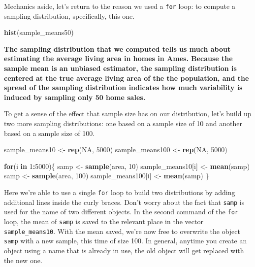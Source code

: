 \documentclass[]{book}
\newenvironment{Shaded}{\begin{snugshade}}{\end{snugshade}}
\newcommand{\KeywordTok}[1]{\textcolor[rgb]{0.13,0.29,0.53}{\textbf{#1}}}
\newcommand{\DecValTok}[1]{\textcolor[rgb]{0.00,0.00,0.81}{#1}}
\newcommand{\StringTok}[1]{\textcolor[rgb]{0.31,0.60,0.02}{#1}}
\newcommand{\OtherTok}[1]{\textcolor[rgb]{0.56,0.35,0.01}{#1}}
\newcommand{\ControlFlowTok}[1]{\textcolor[rgb]{0.13,0.29,0.53}{\textbf{#1}}}
\newcommand{\OperatorTok}[1]{\textcolor[rgb]{0.81,0.36,0.00}{\textbf{#1}}}
\newcommand{\NormalTok}[1]{#1}
\theoremstyle{definition}
\theoremstyle{definition}
\theoremstyle{definition}
\theoremstyle{remark}
\begin{document}
Mechanics aside, let's return to the reason we used a \texttt{for} loop:
to compute a sampling distribution, specifically, this one.

\begin{Shaded}
\begin{Highlighting}[]
\KeywordTok{hist}\NormalTok{(sample_means50)}
\end{Highlighting}
\end{Shaded}

\textbf{The sampling distribution that we computed tells us much about
estimating the average living area in homes in Ames. Because the sample
mean is an unbiased estimator, the sampling distribution is centered at
the true average living area of the the population, and the spread of
the sampling distribution indicates how much variability is induced by
sampling only 50 home sales.}

To get a sense of the effect that sample size has on our distribution,
let's build up two more sampling distributions: one based on a sample
size of 10 and another based on a sample size of 100.

\begin{Shaded}
\begin{Highlighting}[]
\NormalTok{sample_means10 <-}\StringTok{ }\KeywordTok{rep}\NormalTok{(}\OtherTok{NA}\NormalTok{, }\DecValTok{5000}\NormalTok{)}
\NormalTok{sample_means100 <-}\StringTok{ }\KeywordTok{rep}\NormalTok{(}\OtherTok{NA}\NormalTok{, }\DecValTok{5000}\NormalTok{)}

\ControlFlowTok{for}\NormalTok{(i }\ControlFlowTok{in} \DecValTok{1}\OperatorTok{:}\DecValTok{5000}\NormalTok{)\{}
\NormalTok{  samp <-}\StringTok{ }\KeywordTok{sample}\NormalTok{(area, }\DecValTok{10}\NormalTok{)}
\NormalTok{  sample_means10[i] <-}\StringTok{ }\KeywordTok{mean}\NormalTok{(samp)}
\NormalTok{  samp <-}\StringTok{ }\KeywordTok{sample}\NormalTok{(area, }\DecValTok{100}\NormalTok{)}
\NormalTok{  sample_means100[i] <-}\StringTok{ }\KeywordTok{mean}\NormalTok{(samp)}
\NormalTok{\}}
\end{Highlighting}
\end{Shaded}

Here we're able to use a single \texttt{for} loop to build two
distributions by adding additional lines inside the curly braces. Don't
worry about the fact that \texttt{samp} is used for the name of two
different objects. In the second command of the \texttt{for} loop, the
mean of \texttt{samp} is saved to the relevant place in the vector
\texttt{sample\_means10}. With the mean saved, we're now free to
overwrite the object \texttt{samp} with a new sample, this time of size
100. In general, anytime you create an object using a name that is
already in use, the old object will get replaced with the new one.
\end{document}
